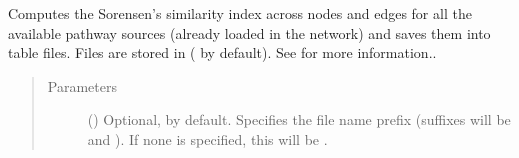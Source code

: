 \documentclass[letterpaper,10pt,english]{sphinxmanual}
\begin{document}
\begin{fulllineitems}
\begin{fulllineitems}
\label{\detokenize{reference:pypath.main.PyPath.pathway_similarity}}
Computes the Sorensen’s similarity index across nodes and edges
for all the available pathway sources (already loaded in the
network) and saves them into table files. Files are stored in
 ( by default).
See {\hyperref[\detokenize{reference:pypath.main.PyPath.sorensen_pathways}]{}} for more
information..
\begin{quote}\begin{description}
\item[{Parameters}] \leavevmode
{} () \textendash{} Optional,  by default. Specifies the file name
prefix (suffixes will be  and ). If
none is specified, this will be
.

\end{description}\end{quote}

\end{fulllineitems}


\begin{fulllineitems}
\label{\detokenize{reference:pypath.main.PyPath.pathways_table}}
\end{fulllineitems}


\begin{fulllineitems}
\label{\detokenize{reference:pypath.main.PyPath.pfam_regions}}
\end{fulllineitems}


\end{fulllineitems}
\end{document}
